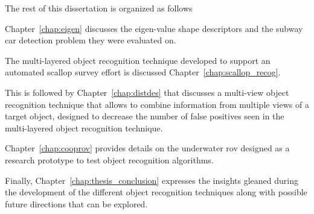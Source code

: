 The rest of this dissertation is organized as follows 
\begin{enumerate*}[label=(\roman*)] 
  \item Chapter~\ref{chap:eigen} discusses the eigen-value shape descriptors and the subway car detection problem they were evaluated on.
  \item The multi-layered object recognition technique developed to support an automated scallop survey effort 
  is discussed Chapter~\ref{chap:scallop_recog}.
  \item This is followed by Chapter~\ref{chap:distdes} that discusses a multi-view object recognition technique that allows to combine information from multiple views of a target object, designed to decrease the number of false positives seen in the multi-layered object recognition technique.
  \item Chapter~\ref{chap:cooprov} provides details on the underwater \gls{rov} designed as a research prototype to test object recognition algorithms.
  \item Finally, Chapter~\ref{chap:thesis_conclusion} expresses the insights gleaned during the development of the different object recognition techniques along with possible future directions that can be explored.
\end{enumerate*}
